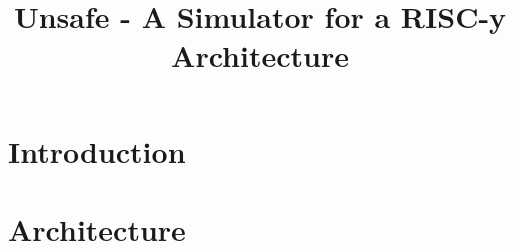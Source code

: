 \documentclass{article}
\title{Unsafe - A Simulator for a RISC-y Architecture}
\begin{document}
\begin{titlepage}
  \maketitle
\end{titlepage}

\section{Introduction}

\section{Architecture}

 
\end{document}
